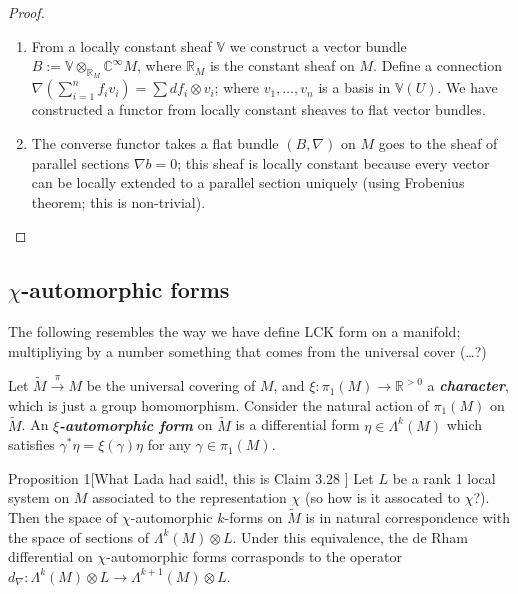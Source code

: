 \begin{proof}\leavevmode
\begin{enumerate}[label=\textbf{Step \arabic*}]
\item From a locally constant sheaf \(\mathbb{V}\) we construct a vector bundle \(B:=\mathbb{V} \otimes_{\mathbb{R}_M}\mathbb{C}^\infty M\), where \(\mathbb{R}_M\) is the constant sheaf on \(M\). Define a connection \(\nabla\left(\sum_{i=1}^n f_iv_i\right) =\sum df_i \otimes v_i\); where \(v_1,\ldots,v_n\) is a basis in \(\mathbb{V}(U)\). {\color{5}We have constructed a functor from locally constant sheaves to flat vector bundles.}

\item The converse functor takes a flat bundle \((B,\nabla)\) on \(M\) goes to the sheaf of parallel sections \(\nabla b=0\); this sheaf is  locally constant because every vector can be locally extended to a parallel section uniquely (using Frobenius theorem; this is non-trivial).
\end{enumerate}
\end{proof}

\subsection{\(\chi\)-automorphic forms}

The following resembles the way we have define LCK form on a manifold; multipliying by a number something that comes from the universal cover (…?)

\begin{defn}\leavevmode
	Let \(\tilde{M} \xrightarrow{\pi}M\) be the universal covering of \(M\), and \(\xi:\pi_1(M) \to \mathbb{R}^{>0}\) a \textit{\textbf{character}}, which is just a group homomorphism. Consider the natural action of \(\pi_1(M)\) on \(\tilde{M}\). An \textit{\textbf{\(\xi\)-automorphic form}} on \(\tilde{M}\) is a differential form \(\eta \in \Lambda^{k}(M)\) which satisfies \(\gamma^* \eta=\xi(\gamma)\eta\) for any \(\gamma \in \pi_{1}(M)\).
\end{defn}

\begin{thing6}{Proposition 1}[What Lada had said!, this is Claim 3.28 \cite{verbi}]\leavevmode
Let \(L\) be a rank 1 local system on \(M\) {\color{3}associated to the representation \(\chi\) (so how is it assocated to \(\chi\)?)}. Then the space of \(\chi\)-automorphic \(k\)-forms on \(\tilde{M}\) is in natural correspondence with the space of sections of \(\Lambda^{k}(M)\otimes L\). Under this equivalence, the de Rham differential on \(\chi\)-automorphic forms corrasponds to the operator \(d_\nabla: \Lambda^{k}(M)\otimes L \to \Lambda^{k+1}(M)\otimes L\).
\end{thing6}

